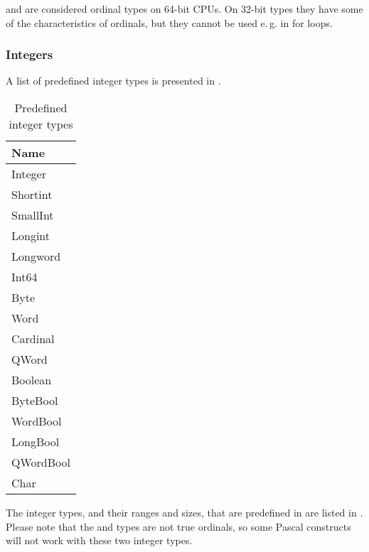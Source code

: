 \begin{remark}
 and  are considered ordinal types on 64-bit CPUs. On 32-bit types
they have some of the characteristics of ordinals, but they cannot be used
e.\,g. in for loops.
\end{remark}

\subsubsection{Integers}
A list of predefined integer types is presented in .

    
   
   
	 
   
    
   
   

%
\begin{table}[ht]
\caption{Predefined integer types}
\label{tab:integerstyp}
\begin{center}
\begin{tabular}{l}
Name\\ \hline
Integer \\
Shortint \\
SmallInt \\
Longint \\
Longword \\
Int64 \\
Byte \\
Word \\
Cardinal \\
QWord \\
Boolean \\
ByteBool \\
WordBool \\
LongBool \\
QWordBool \\
Char \\ \hline
\end{tabular}
\end{center}
\end{table}
The integer types, and their ranges and sizes, that are predefined in
\fpc are listed in . Please note that
the  and  types are not true ordinals, so
some Pascal constructs will not work with these two integer types.

